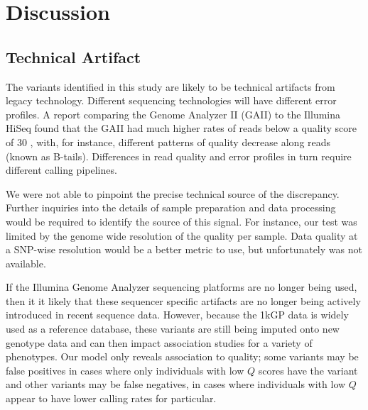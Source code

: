 \documentclass[9pt,lineno]{elife}
\begin{document}
\section{Discussion}

\subsection{Technical Artifact}
The variants identified in this study are likely to be technical artifacts from legacy technology.
Different sequencing technologies will have different error profiles. 
A report comparing the Genome Analyzer II (GAII) to the Illumina HiSeq found that the GAII had much higher rates of reads below a quality score of 30 \citep{Minoche2011}, with, for instance, different patterns of quality decrease along reads (known as B-tails). 
Differences in read quality and error profiles in turn require different calling pipelines.
 
We were not able to pinpoint the precise technical source of the discrepancy. 
Further inquiries into the details of sample preparation and data processing would be required to identify the source of this signal. 
For instance, our test was limited by the genome wide resolution of the quality per sample.
Data quality at a SNP-wise resolution would be a better metric to use, but unfortunately was not available.

If the Illumina Genome Analyzer sequencing platforms are no longer being used, then it it likely that these sequencer specific artifacts are no longer being actively introduced in recent sequence data.
However, because the 1kGP data is widely used as a reference database, these variants are still being imputed onto new genotype data and can then impact association studies for a variety of phenotypes.
Our model only reveals association to quality; some variants may be false positives in cases where only individuals with low $Q$ scores have the variant and other variants may be false negatives, in cases where individuals with low $Q$ appear to have lower calling rates for particular.
\end{document}
